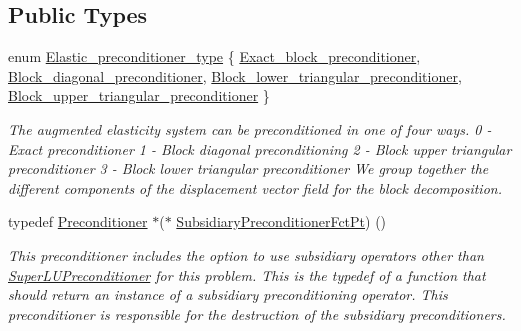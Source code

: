 \subsection*{Public Types}
\begin{DoxyCompactItemize}
\item 
enum \hyperlink{classoomph_1_1PseudoElasticPreconditioner_acde733e1a111a961d1e714add4e8015d}{Elastic\+\_\+preconditioner\+\_\+type} \{ \hyperlink{classoomph_1_1PseudoElasticPreconditioner_acde733e1a111a961d1e714add4e8015da277774b20738300271de0fa42391a951}{Exact\+\_\+block\+\_\+preconditioner}, 
\hyperlink{classoomph_1_1PseudoElasticPreconditioner_acde733e1a111a961d1e714add4e8015da048620d7667a53bcfb11513dea9b2977}{Block\+\_\+diagonal\+\_\+preconditioner}, 
\hyperlink{classoomph_1_1PseudoElasticPreconditioner_acde733e1a111a961d1e714add4e8015dabf00157409786d29ec7122bb86a5e8fe}{Block\+\_\+lower\+\_\+triangular\+\_\+preconditioner}, 
\hyperlink{classoomph_1_1PseudoElasticPreconditioner_acde733e1a111a961d1e714add4e8015daed4f4716017bc0f8d0c40ed7aaab735e}{Block\+\_\+upper\+\_\+triangular\+\_\+preconditioner}
 \}\begin{DoxyCompactList}\small\item\em The augmented elasticity system can be preconditioned in one of four ways. 0 -\/ Exact preconditioner 1 -\/ Block diagonal preconditioning 2 -\/ Block upper triangular preconditioner 3 -\/ Block lower triangular preconditioner We group together the different components of the displacement vector field for the block decomposition. \end{DoxyCompactList}
\item 
typedef \hyperlink{classoomph_1_1Preconditioner}{Preconditioner} $\ast$($\ast$ \hyperlink{classoomph_1_1PseudoElasticPreconditioner_a1462e1ef48ed2668c06dfd36c783d1a5}{Subsidiary\+Preconditioner\+Fct\+Pt}) ()
\begin{DoxyCompactList}\small\item\em This preconditioner includes the option to use subsidiary operators other than \hyperlink{classoomph_1_1SuperLUPreconditioner}{Super\+L\+U\+Preconditioner} for this problem. This is the typedef of a function that should return an instance of a subsidiary preconditioning operator. This preconditioner is responsible for the destruction of the subsidiary preconditioners. \end{DoxyCompactList}\end{DoxyCompactItemize}
